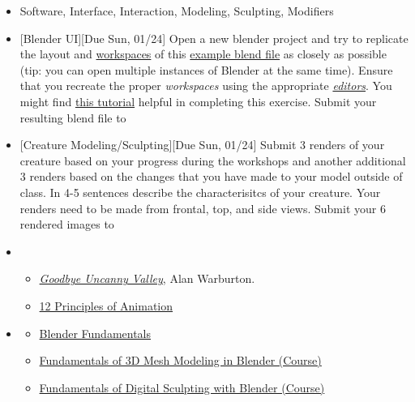\def\dMon{Mon, 01/18}
\def\dTues{Tues, 01/19}
\def\dWed{Wed, 01/20}
\def\dThur{Thur, 01/21}
\def\dFri{Fri, 01/22}
\def\dSat{Sat, 01/23}
\def\dSun{Sun, 01/24}
\placeDate

\begin{itemize}[noitemsep,topsep=0pt,leftmargin=*]
      \item {} Software, Interface, Interaction, Modeling, Sculpting, Modifiers
      \item {}[Blender UI][Due \dSun] Open a new blender project and try to replicate the layout and \href{https://docs.blender.org/manual/en/latest/interface/window_system/workspaces.html}{workspaces} of this \href{supplements/3001-Ex1.blend}{example blend file} as closely as possible (tip: you can open multiple instances of Blender at the same time). Ensure that you recreate the proper \emph{workspaces} using the appropriate \href{https://docs.blender.org/manual/en/latest/editors/index.html}{\emph{editors}}. You might find \href{https://youtu.be/7DNmaR7TKwU}{this tutorial} helpful in completing this exercise. Submit your resulting blend file to \discordE
      \item {}[Creature Modeling/Sculpting][Due \dSun] Submit 3 renders of your creature based on your progress during the workshops and another additional 3 renders based on the changes that you have made to your model outside of class. In 4-5 sentences describe the characterisitcs of your creature. Your renders need to be made from frontal, top, and side views. Submit your 6 rendered images to \discordE
      \item {}
            \begin{itemize}
                  \item \href{https://alanwarburton.co.uk/goodbye-uncanny-valley}{\emph{Goodbye Uncanny Valley}}, Alan Warburton.
                  \item \href{https://www.youtube.com/watch?v=uDqjIdI4bF4}{12 Principles of Animation }
            \end{itemize}
      \item {}
            \begin{resenv}
                  \begin{itemize}
                        \item \href{https://cloud.blender.org/p/blender-fundamentals/}{Blender Fundamentals}
                        \item \href{http://bit.ly/39jpRN5}{Fundamentals of 3D Mesh Modeling in Blender (Course)}
                        \item \href{http://bit.ly/38urSXu}{Fundamentals of Digital Sculpting with Blender (Course)}
                  \end{itemize}
            \end{resenv}
\end{itemize}
